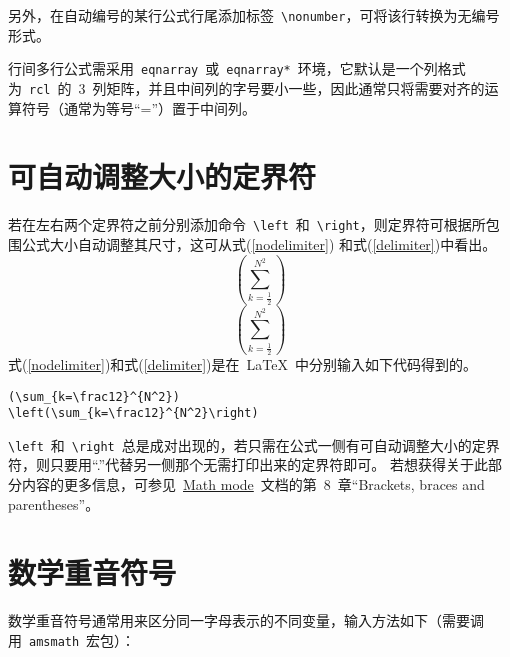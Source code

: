 另外，在自动编号的某行公式行尾添加标签~\verb|\nonumber|，可将该行转换为无编号形式。

行间多行公式需采用~\verb|eqnarray|~或~\verb|eqnarray*|~环境，它默认是一个列格式为~\verb|rcl|~的~3~列矩阵，并且中间列的字号要小一些，因此通常只将需要对齐的运算符号（通常为等号“=”）置于中间列。

\section{可自动调整大小的定界符}

若在左右两个定界符之前分别添加命令~\verb|\left|~和~\verb|\right|，则定界符可根据所包围公式大小自动调整其尺寸，这可从式(\ref{nodelimiter}) 和式(\ref{delimiter})中看出。
\begin{equation}\label{nodelimiter}
(\sum_{k=\frac12}^{N^2})
\end{equation}
\begin{equation}\label{delimiter}
\left(\sum_{k=\frac12}^{N^2}\right)
\end{equation}
式(\ref{nodelimiter})和式(\ref{delimiter})是在~\LaTeX~中分别输入如下代码得到的。
\begin{verbatim}
(\sum_{k=\frac12}^{N^2})
\left(\sum_{k=\frac12}^{N^2}\right)
\end{verbatim}
\verb|\left|~和~\verb|\right|~总是成对出现的，若只需在公式一侧有可自动调整大小的定界符，则只要用“.”代替另一侧那个无需打印出来的定界符即可。
若想获得关于此部分内容的更多信息，可参见~\href{http://tug.ctan.org/cgi-bin/ctanPackageInformation.py?id=voss-mathmode}{Math mode}~文档的第~8~章“Brackets, braces and parentheses”。

\section{数学重音符号}
数学重音符号通常用来区分同一字母表示的不同变量，输入方法如下（需要调用~\verb|amsmath|~宏包）：

